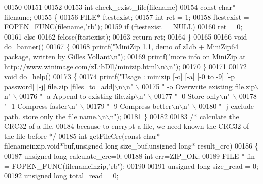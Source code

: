 \begin{DoxyCode}
00150 
00151 
00152 
00153 \textcolor{keywordtype}{int} check\_exist\_file(filename)
00154     \textcolor{keyword}{const} \textcolor{keywordtype}{char}* filename;
00155 \{
00156     FILE* ftestexist;
00157     \textcolor{keywordtype}{int} ret = 1;
00158     ftestexist = FOPEN\_FUNC(filename,\textcolor{stringliteral}{"rb"});
00159     \textcolor{keywordflow}{if} (ftestexist==NULL)
00160         ret = 0;
00161     \textcolor{keywordflow}{else}
00162         fclose(ftestexist);
00163     \textcolor{keywordflow}{return} ret;
00164 \}
00165 
00166 \textcolor{keywordtype}{void} do\_banner()
00167 \{
00168     printf(\textcolor{stringliteral}{"MiniZip 1.1, demo of zLib + MiniZip64 package, written by Gilles Vollant\(\backslash\)n"});
00169     printf(\textcolor{stringliteral}{"more info on MiniZip at http://www.winimage.com/zLibDll/minizip.html\(\backslash\)n\(\backslash\)n"});
00170 \}
00171 
00172 \textcolor{keywordtype}{void} do\_help()
00173 \{
00174     printf(\textcolor{stringliteral}{"Usage : minizip [-o] [-a] [-0 to -9] [-p password] [-j] file.zip [files\_to\_add]\(\backslash\)n\(\backslash\)n"} \(\backslash\)
00175            \textcolor{stringliteral}{"  -o  Overwrite existing file.zip\(\backslash\)n"} \(\backslash\)
00176            \textcolor{stringliteral}{"  -a  Append to existing file.zip\(\backslash\)n"} \(\backslash\)
00177            \textcolor{stringliteral}{"  -0  Store only\(\backslash\)n"} \(\backslash\)
00178            \textcolor{stringliteral}{"  -1  Compress faster\(\backslash\)n"} \(\backslash\)
00179            \textcolor{stringliteral}{"  -9  Compress better\(\backslash\)n\(\backslash\)n"} \(\backslash\)
00180            \textcolor{stringliteral}{"  -j  exclude path. store only the file name.\(\backslash\)n\(\backslash\)n"});
00181 \}
00182 
00183 \textcolor{comment}{/* calculate the CRC32 of a file,}
00184 \textcolor{comment}{   because to encrypt a file, we need known the CRC32 of the file before */}
00185 \textcolor{keywordtype}{int} getFileCrc(\textcolor{keyword}{const} \textcolor{keywordtype}{char}* filenameinzip,\textcolor{keywordtype}{void}*buf,\textcolor{keywordtype}{unsigned} \textcolor{keywordtype}{long} size\_buf,\textcolor{keywordtype}{unsigned} \textcolor{keywordtype}{long}* result\_crc)
00186 \{
00187    \textcolor{keywordtype}{unsigned} \textcolor{keywordtype}{long} calculate\_crc=0;
00188    \textcolor{keywordtype}{int} err=ZIP\_OK;
00189    FILE * fin = FOPEN\_FUNC(filenameinzip,\textcolor{stringliteral}{"rb"});
00190 
00191    \textcolor{keywordtype}{unsigned} \textcolor{keywordtype}{long} size\_read = 0;
00192    \textcolor{keywordtype}{unsigned} \textcolor{keywordtype}{long} total\_read = 0;

\end{DoxyCode}
